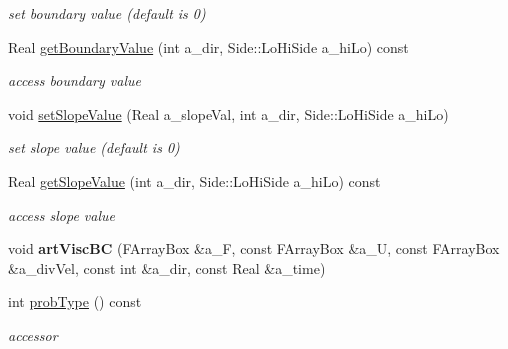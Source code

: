 \begin{DoxyCompactItemize}
\begin{DoxyCompactList}\small\item\em set boundary value (default is 0) \end{DoxyCompactList}\item 
\hypertarget{class_advect_scalar_i_b_c_a02b66782dbd4203eea4e3be1d88b009b}{Real \hyperlink{class_advect_scalar_i_b_c_a02b66782dbd4203eea4e3be1d88b009b}{get\-Boundary\-Value} (int a\-\_\-dir, Side\-::\-Lo\-Hi\-Side a\-\_\-hi\-Lo) const }\label{class_advect_scalar_i_b_c_a02b66782dbd4203eea4e3be1d88b009b}

\begin{DoxyCompactList}\small\item\em access boundary value \end{DoxyCompactList}\item 
\hypertarget{class_advect_scalar_i_b_c_ad1355c6945bb10cb93725d2eec6f413a}{void \hyperlink{class_advect_scalar_i_b_c_ad1355c6945bb10cb93725d2eec6f413a}{set\-Slope\-Value} (Real a\-\_\-slope\-Val, int a\-\_\-dir, Side\-::\-Lo\-Hi\-Side a\-\_\-hi\-Lo)}\label{class_advect_scalar_i_b_c_ad1355c6945bb10cb93725d2eec6f413a}

\begin{DoxyCompactList}\small\item\em set slope value (default is 0) \end{DoxyCompactList}\item 
\hypertarget{class_advect_scalar_i_b_c_a00e0df1f280bff19fc7035e651469557}{Real \hyperlink{class_advect_scalar_i_b_c_a00e0df1f280bff19fc7035e651469557}{get\-Slope\-Value} (int a\-\_\-dir, Side\-::\-Lo\-Hi\-Side a\-\_\-hi\-Lo) const }\label{class_advect_scalar_i_b_c_a00e0df1f280bff19fc7035e651469557}

\begin{DoxyCompactList}\small\item\em access slope value \end{DoxyCompactList}\item 
\hypertarget{class_advect_scalar_i_b_c_ac61b596d0577240568dff52d94b839e1}{void {\bfseries art\-Visc\-B\-C} (F\-Array\-Box \&a\-\_\-\-F, const F\-Array\-Box \&a\-\_\-\-U, const F\-Array\-Box \&a\-\_\-div\-Vel, const int \&a\-\_\-dir, const Real \&a\-\_\-time)}\label{class_advect_scalar_i_b_c_ac61b596d0577240568dff52d94b839e1}

\item 
\hypertarget{class_advect_scalar_i_b_c_a06f530c3996646cd23c0fd67f1e4b619}{int \hyperlink{class_advect_scalar_i_b_c_a06f530c3996646cd23c0fd67f1e4b619}{prob\-Type} () const }\label{class_advect_scalar_i_b_c_a06f530c3996646cd23c0fd67f1e4b619}

\begin{DoxyCompactList}\small\item\em accessor \end{DoxyCompactList}\end{DoxyCompactItemize}
